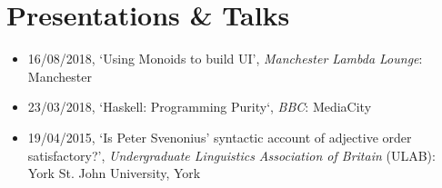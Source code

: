 \section{Presentations \& Talks}

\begin{itemize}
	\item 16/08/2018, `Using Monoids to build UI', \emph{Manchester Lambda Lounge}: Manchester
	\item 23/03/2018, `Haskell: Programming Purity`, \emph{BBC}: MediaCity
	\item 19/04/2015, `Is Peter Svenonius' syntactic account of adjective order satisfactory?', \emph{Undergraduate Linguistics Association of Britain} (ULAB): York St. John University, York
\end{itemize}